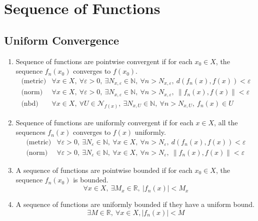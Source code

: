 \chapter{Sequence of Functions}
\section{Uniform Convergence}
\begin{enumerate}
	\item Sequence of functions are pointwise convergent if for each $x_0 \in X$, the sequence $f_n(x_0)$ converges to $f(x_0)$.
	\begin{eqnarray}
		\text{(metric)} & \forall x \in X,\ \forall \varepsilon > 0,\ \exists N_{x,\varepsilon} \in \mathbb{N},\ \forall n > N_{x,\varepsilon},\ d(f_n(x),f(x)) < \varepsilon \\
		\text{(norm)} & \forall x \in X,\ \forall \varepsilon > 0,\ \exists N_{x,\varepsilon} \in \mathbb{N},\ \forall n > N_{x,\varepsilon},\  \|f_n(x),f(x)\| < \varepsilon\\
	\text{(nbd)} & \forall x \in X,\ \forall U \in \mathcal{N}_{f(x)},\ \exists N_{x,U} \in \mathbb{N},\ \forall n > N_{x,U},\  f_n(x) \in U
	\end{eqnarray}
	\item Sequence of functions are uniformly convergent  if for each $x \in X$, all the sequences $f_n(x)$ converges to $f(x)$ uniformly.
	\begin{eqnarray}
	\text{(metric)} & \forall \varepsilon > 0,\ \exists N_{\varepsilon} \in \mathbb{N},\ \forall x \in X,\ \forall n > N_{\varepsilon},\ d(f_n(x),f(x)) < \varepsilon \\
	\text{(norm)} & \forall \varepsilon > 0,\ \exists N_{\varepsilon} \in \mathbb{N},\ \forall x \in X,\ \forall n > N_{\varepsilon},\  \|f_n(x),f(x)\| < \varepsilon
	\end{eqnarray}
	\item A sequence of functions are pointwise bounded if for each $x_0 \in X$, the sequence $f_n(x_0)$ is bounded.
		$$ \forall x \in X,\ \exists M_x \in \mathbb{R},\ |f_n(x)| < M_x $$
	\item A sequence of functions are uniformly bounded if they have a uniform bound.
		$$ \exists M \in \mathbb{R},\ \forall x \in X, |f_n(x)| < M $$
\end{enumerate}

